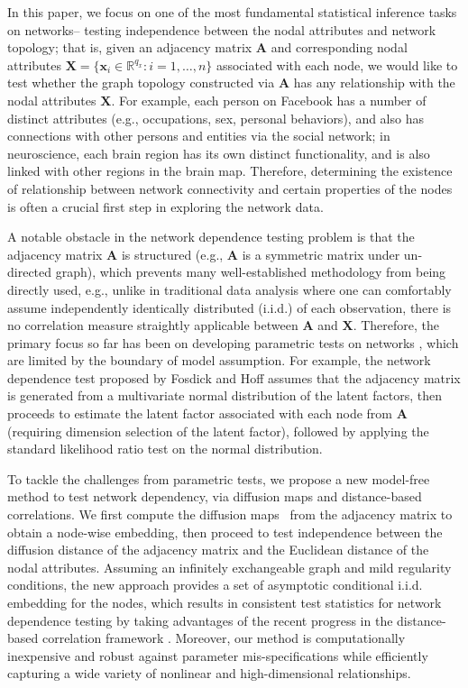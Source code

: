 \documentclass[11pt]{article}
\theoremstyle{definition}
\begin{document}
In this paper, we focus on one of the most fundamental statistical inference tasks on networks-- testing independence between the nodal attributes and network topology; that is, given an adjacency matrix $\mathbf{A}$ and corresponding nodal attributes $\mathbf{X} = \{  \mathbf{x}_{i} \in \mathbb{R}^{q_{x}} : i = 1, \ldots, n \}$ associated with each node, we would like to test whether the graph topology constructed via $\mathbf{A}$ has any relationship with the nodal attributes $\mathbf{X}$. For example, each person on Facebook has a number of distinct attributes (e.g., occupations, sex, personal behaviors), and also has connections with other persons and entities via the social network; in neuroscience, each brain region has its own distinct functionality, and is also linked with other regions in the brain map. Therefore, determining the existence of relationship between network connectivity and certain properties of the nodes is often a crucial first step in exploring the network data. 

A notable obstacle in the network dependence testing problem is that the adjacency matrix $\mathbf{A}$ is structured (e.g., $\mathbf{A}$ is a symmetric matrix under un-directed graph), which prevents many well-established methodology from being directly used, e.g., unlike in traditional data analysis where one can comfortably assume independently identically distributed (i.i.d.) of each observation, there is no correlation measure straightly applicable between $\mathbf{A}$ and $\mathbf{X}$. Therefore, the primary focus so far has been on developing parametric tests on networks \cite{wasserman1996logit, fosdick2015testing, howard2016understanding}, which are limited by the boundary of model assumption. For example, the network dependence test proposed by Fosdick and Hoff \cite{fosdick2015testing} assumes that the adjacency matrix is generated from a multivariate normal distribution of the latent factors, then proceeds to estimate the latent factor associated with each node from $\mathbf{A}$ (requiring dimension selection of the latent factor), followed by applying the standard likelihood ratio test on the normal distribution.

To tackle the challenges from parametric tests, we propose a new model-free method to test network dependency, via diffusion maps and distance-based correlations. We first compute the diffusion maps~\cite{coifman2005geometric,coifman2006diffusion,lafon2006diffusion} from the adjacency matrix to obtain a node-wise embedding, then proceed to test independence between the diffusion distance of the adjacency matrix and the Euclidean distance of the nodal attributes. Assuming an infinitely exchangeable graph and mild regularity conditions, the new approach provides a set of asymptotic conditional i.i.d. embedding for the nodes, which results in consistent test statistics for network dependence testing by taking advantages of the recent progress in the distance-based correlation framework \cite{szekely2007measuring,szekelyRizzo2013a, shen2016discovering}. Moreover, our method is computationally inexpensive and robust against parameter mis-specifications while efficiently capturing a wide variety of nonlinear and high-dimensional relationships.  
\end{document}
